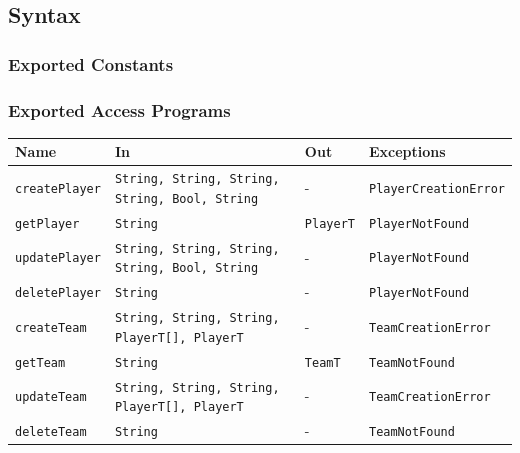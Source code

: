 \documentclass[12pt, titlepage]{article}
\begin{document}
\subsection{Syntax}

\subsubsection{Exported Constants}

\subsubsection{Exported Access Programs}

\begin{center}
  \begin{tabular}{p{4cm} p{4cm} p{4cm} p{4cm}}
    \toprule
    \textbf{Name}                 & \textbf{In}                                                             & \textbf{Out}       & \textbf{Exceptions}          \\
    \midrule
    \texttt{createPlayer}         & \texttt{String, String, String, String, Bool, String}                   & -                  & \texttt{PlayerCreationError} \\
    \texttt{getPlayer}            & \texttt{String}                                                         & \texttt{PlayerT}   & \texttt{PlayerNotFound}      \\
    \texttt{updatePlayer}         & \texttt{String, String, String, String, Bool, String}                   & -                  & \texttt{PlayerNotFound}      \\
    \texttt{deletePlayer}         & \texttt{String}                                                         & -                  & \texttt{PlayerNotFound}      \\
    \texttt{createTeam}           & \texttt{String, String, String, PlayerT[], PlayerT}                     & -                  & \texttt{TeamCreationError}   \\
    \texttt{getTeam}              & \texttt{String}                                                         & \texttt{TeamT}     & \texttt{TeamNotFound}        \\
    \texttt{updateTeam}           & \texttt{String, String, String, PlayerT[], PlayerT}                     & -                  & \texttt{TeamCreationError}   \\
    \texttt{deleteTeam}           & \texttt{String}                                                         & -                  & \texttt{TeamNotFound}        \\

\end{tabular}
\end{center}
\end{document}

